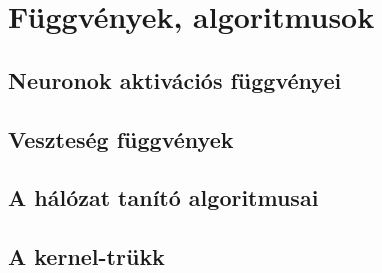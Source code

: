 \section{Függvények, algoritmusok}

\subsection{Neuronok aktivációs függvényei}

\subsection{Veszteség függvények}

\subsection{A hálózat tanító algoritmusai}

\subsection{A kernel-trükk}

